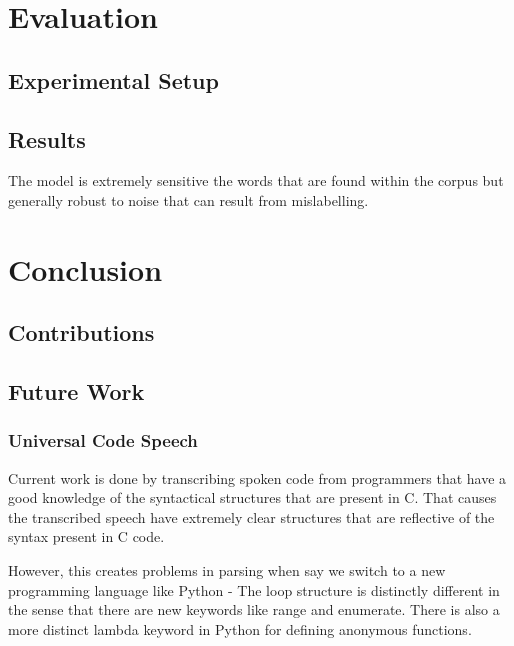 \documentclass[fyp]{socreport}
\begin{document}



\chapter{Evaluation}


\section{Experimental Setup}

\section{Results}

The model is extremely sensitive the words that are found within the corpus but generally
robust to noise that can result from mislabelling.



\chapter{Conclusion}

\section{Contributions}

\section{Future Work}


\subsection{Universal Code Speech}
Current work is done by transcribing spoken code from programmers that have a
good knowledge of the syntactical structures that are present in C. That causes
the transcribed speech have extremely clear structures that are reflective of
the syntax present in C code.

However, this creates problems in parsing when say we switch to a new
programming language like Python - The loop structure is distinctly different
in the sense that there are new keywords like range and enumerate. There is
also a more distinct lambda keyword in Python for defining anonymous functions.
\end{document}
